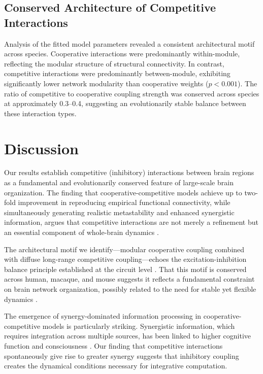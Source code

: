 \documentclass[11pt]{article}
\begin{document}
\subsection{Conserved Architecture of Competitive Interactions}

Analysis of the fitted model parameters revealed a consistent architectural motif across species. Cooperative interactions were predominantly within-module, reflecting the modular structure of structural connectivity. In contrast, competitive interactions were predominantly between-module, exhibiting significantly lower network modularity than cooperative weights ($p < 0.001$). The ratio of competitive to cooperative coupling strength was conserved across species at approximately 0.3--0.4, suggesting an evolutionarily stable balance between these interaction types.

\section{Discussion}

Our results establish competitive (inhibitory) interactions between brain regions as a fundamental and evolutionarily conserved feature of large-scale brain organization. The finding that cooperative-competitive models achieve up to two-fold improvement in reproducing empirical functional connectivity, while simultaneously generating realistic metastability and enhanced synergistic information, argues that competitive interactions are not merely a refinement but an essential component of whole-brain dynamics \citep{deco2011emerging, breakspear2017dynamic}.

The architectural motif we identify---modular cooperative coupling combined with diffuse long-range competitive coupling---echoes the excitation-inhibition balance principle established at the circuit level \citep{vreeswijk1996chaos, brunel2000dynamics}. That this motif is conserved across human, macaque, and mouse suggests it reflects a fundamental constraint on brain network organization, possibly related to the need for stable yet flexible dynamics \citep{deco2014local, honey2009predicting}.

The emergence of synergy-dominated information processing in cooperative-competitive models is particularly striking. Synergistic information, which requires integration across multiple sources, has been linked to higher cognitive function and consciousness \citep{luppi2022synergistic, mediano2021towards}. Our finding that competitive interactions spontaneously give rise to greater synergy suggests that inhibitory coupling creates the dynamical conditions necessary for integrative computation.
\end{document}
